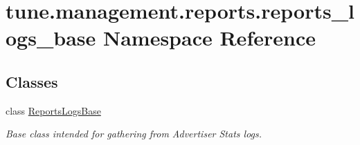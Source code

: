 \hypertarget{namespacetune_1_1management_1_1reports_1_1reports__logs__base}{\section{tune.\-management.\-reports.\-reports\-\_\-logs\-\_\-base Namespace Reference}
\label{namespacetune_1_1management_1_1reports_1_1reports__logs__base}
}
\subsection*{Classes}
\begin{DoxyCompactItemize}
\item 
class \hyperlink{classtune_1_1management_1_1reports_1_1reports__logs__base_1_1ReportsLogsBase}{Reports\-Logs\-Base}
\begin{DoxyCompactList}\small\item\em Base class intended for gathering from Advertiser Stats logs. \end{DoxyCompactList}\end{DoxyCompactItemize}
